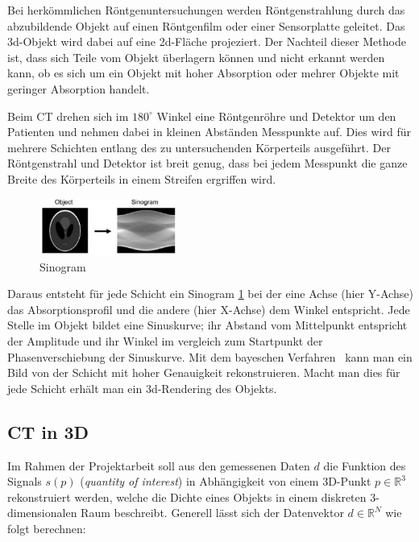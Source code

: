 Bei herkömmlichen Röntgenuntersuchungen werden Röntgenstrahlung durch das abzubildende Objekt auf einen Röntgenfilm oder einer Sensorplatte geleitet. Das 3d-Objekt wird dabei auf eine 2d-Fläche projeziert. Der Nachteil dieser Methode ist, dass sich Teile vom Objekt überlagern können und nicht erkannt werden kann, ob es sich um ein Objekt mit hoher Absorption oder mehrer Objekte mit geringer Absorption handelt.

Beim CT drehen sich im $180^\circ$ Winkel eine Röntgenröhre und Detektor um den Patienten und nehmen dabei in kleinen Abständen Messpunkte auf. Dies wird für mehrere Schichten entlang des zu untersuchenden Körperteils ausgeführt. Der Röntgenstrahl und Detektor ist breit genug, dass bei jedem Messpunkt die ganze Breite des Körperteils in einem Streifen ergriffen wird.

\begin{figure}
 \includegraphics[width=0.4\textwidth]{k4.2/backprojektion.png}
 \caption{Sinogram}
 \label{k4.2.tomo.ct.bp}
\end{figure}

Daraus entsteht für jede Schicht ein Sinogram \cref{k4.2.tomo.ct.bp} bei der eine Achse (hier Y-Achse) das Absorptionsprofil und die andere (hier X-Achse) dem Winkel entspricht. Jede Stelle im Objekt bildet eine Sinuskurve; ihr Abstand vom Mittelpunkt entspricht der Amplitude und ihr Winkel im vergleich zum Startpunkt der Phasenverschiebung der Sinuskurve. Mit dem bayeschen Verfahren  kann man ein Bild von der Schicht mit hoher Genauigkeit rekonstruieren. Macht man dies für jede Schicht erhält man ein 3d-Rendering des Objekts.


\subsection{CT in 3D}\label{k4.2.ct.3d}

Im Rahmen der Projektarbeit soll aus den gemessenen Daten $d$ die Funktion des Signals $s(p)$ (\emph{quantity of interest}) in Abhängigkeit von einem 3D-Punkt $p \in \mathbb{R}^3$ rekonstruiert werden, welche die Dichte eines Objekts in einem diskreten 3-dimensionalen Raum beschreibt. Generell lässt sich der Datenvektor $d \in \mathbb{R}^N$ wie folgt berechnen:

